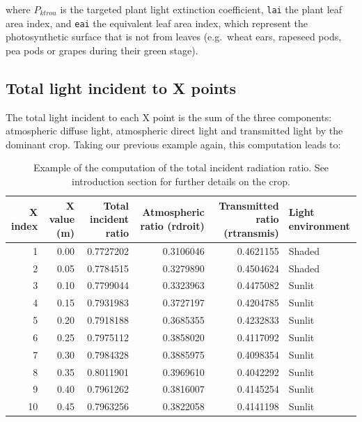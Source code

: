 \documentclass[]{book}
\theoremstyle{definition}
\theoremstyle{definition}
\theoremstyle{definition}
\theoremstyle{remark}
\begin{document}
where \(P_{ktrou}\) is the targeted plant light extinction coefficient,
\texttt{lai} the plant leaf area index, and \texttt{eai} the equivalent
leaf area index, which represent the photosynthetic surface that is not
from leaves (e.g.~wheat ears, rapeseed pods, pea pods or grapes during
their green stage).

\subsection{Total light incident to X
points}\label{total-light-incident-to-x-points}

The total light incident to each X point is the sum of the three
components: atmospheric diffuse light, atmospheric direct light and
transmitted light by the dominant crop. Taking our previous example
again, this computation leads to:

\begin{table}

\caption{\label{tab:unnamed-chunk-5}Example of the computation of the total incident radiation ratio. See introduction section for further details on the crop.}
\centering
\begin{tabular}[t]{r|r|r|r|r|l}
\hline
X index & X value (m) & Total incident ratio & Atmospheric ratio (rdroit) & Transmitted ratio (rtransmis) & Light environment\\
\hline
1 & 0.00 & 0.7727202 & 0.3106046 & 0.4621155 & Shaded\\
\hline
2 & 0.05 & 0.7784515 & 0.3279890 & 0.4504624 & Shaded\\
\hline
3 & 0.10 & 0.7799044 & 0.3323963 & 0.4475082 & Sunlit\\
\hline
4 & 0.15 & 0.7931983 & 0.3727197 & 0.4204785 & Sunlit\\
\hline
5 & 0.20 & 0.7918188 & 0.3685355 & 0.4232833 & Sunlit\\
\hline
6 & 0.25 & 0.7975112 & 0.3858020 & 0.4117092 & Sunlit\\
\hline
7 & 0.30 & 0.7984328 & 0.3885975 & 0.4098354 & Sunlit\\
\hline
8 & 0.35 & 0.8011901 & 0.3969610 & 0.4042292 & Sunlit\\
\hline
9 & 0.40 & 0.7961262 & 0.3816007 & 0.4145254 & Sunlit\\
\hline
10 & 0.45 & 0.7963256 & 0.3822058 & 0.4141198 & Sunlit\\
\hline
\end{tabular}
\end{table}
\end{document}
